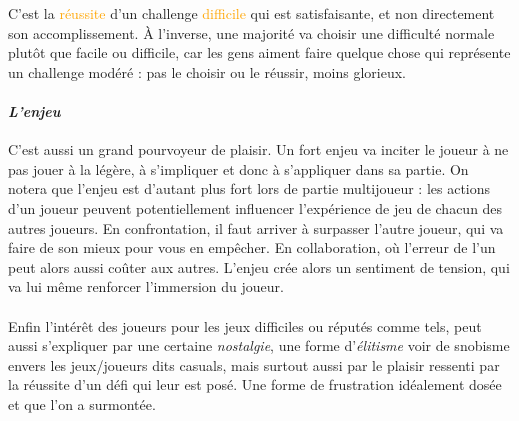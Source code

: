 C'est la \textcolor{orange}{réussite} d'un challenge \textcolor{orange}{difficile} qui est satisfaisante, et non directement son accomplissement. À l'inverse, une majorité va choisir une difficulté normale plutôt que facile ou difficile, car les gens aiment \textcolor{vert}{faire} quelque chose qui représente un \textcolor{vert}{challenge modéré} : pas le choisir ou le réussir, moins glorieux.

			\paragraph{\emph{L’enjeu} \\ \quad}
C’est aussi un grand pourvoyeur de plaisir. Un fort enjeu va inciter le joueur à ne pas jouer à la légère, à s’impliquer et donc à s’appliquer dans sa partie. On notera que l’enjeu est d’autant plus fort lors de partie multijoueur : les actions d’un joueur peuvent potentiellement influencer l’expérience de jeu de chacun des autres joueurs. En confrontation, il faut arriver à surpasser l’autre joueur, qui va faire de son mieux pour vous en empêcher. En collaboration, où l’erreur de l’un peut alors aussi coûter aux autres. L’enjeu crée alors un sentiment de tension, qui va lui même renforcer l’immersion du joueur.

\paragraph{}Enfin l’intérêt des joueurs pour les jeux difficiles ou réputés comme tels, peut aussi s’expliquer par une certaine \emph{nostalgie}, une forme d’\emph{élitisme} voir de snobisme envers les jeux/joueurs dits casuals, mais surtout aussi par le plaisir ressenti par la réussite d’un défi qui leur est posé. Une forme de frustration idéalement dosée et que l’on a surmontée.


